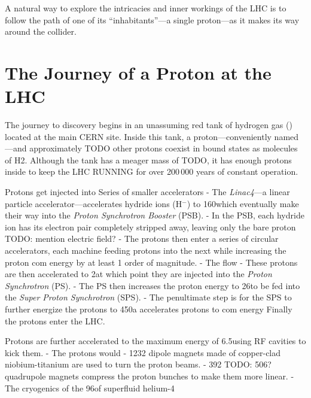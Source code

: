 


A natural way to explore the intricacies and inner workings of the LHC is to follow the path of one of its ``inhabitants''---a single proton---as it makes its way around the collider.

\section{The Journey of a Proton at the LHC}
The journey to discovery begins in an unassuming red tank of hydrogen gas (\htwo) located at the main CERN site.
Inside this tank, a proton---conveniently named \pname---and approximately TODO  other protons coexist in bound states as molecules of H2.
Although the tank has a meager mass of TODO\Kg, it has enough protons inside to keep the LHC RUNNING for over 200\,000 years of constant operation.

Protons get injected into Series of smaller accelerators
    - The \emph{Linac4}---a linear particle accelerator---accelerates hydride ions (H$^-$) to 160\MeV which eventually make their way into the \emph{Proton Synchrotron Booster} (PSB).
    - In the PSB, each hydride ion has its electron pair completely stripped away, leaving only the bare proton TODO: mention electric field?
    - The protons then enter a series of circular accelerators, each machine feeding protons into the next while increasing the proton com energy by at least 1 order of magnitude.
    - The flow 
    - These protons are then accelerated to 2\GeV at which point they are injected into the \emph{Proton Synchrotron} (PS).
    - The PS then increases the proton energy to 26\GeV to be fed into the \emph{Super Proton Synchrotron} (SPS).
    - The penultimate step is for the SPS to further energize the protons to 450\GeV a accelerates protons to com energy
Finally the protons enter the LHC.

Protons are further accelerated to the maximum energy of 6.5\TeV using RF cavities to kick them.
- The protons would 
- 1232 dipole magnets made of copper-clad niobium-titanium are used to turn the proton beams.
- 392 TODO: 506? quadrupole magnets compress the proton bunches to make them more linear.
- The cryogenics of the 96\tonne of superfluid helium-4

